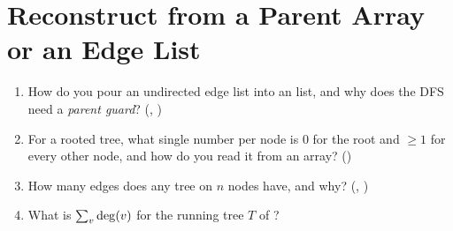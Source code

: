 \section{Reconstruct from a Parent Array or an Edge List}\label{sec:c25-parent}

\begin{previouslybox}
\begin{enumerate}[nosep, leftmargin=1.6em]
  \item How do you pour an undirected edge list into an  list, and why does the DFS
        need a \emph{parent guard}? (, )
  \item For a rooted tree, what single number per node is $0$ for the root and $\ge 1$ for every
        other node, and how do you read it from an array? ()
  \item How many edges does any tree on $n$ nodes have, and why? (, )
  \item What is $\sum_v \operatorname{deg}(v)$ for the running tree $T$ of ?
\end{enumerate}
\end{previouslybox}

